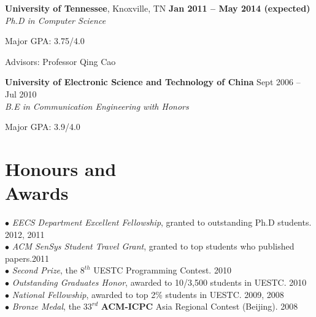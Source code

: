 \documentclass[margin,line]{resume}
\begin{document}
\begin{resume}
    \textbf{University of Tennessee}, Knoxville, TN \hfill \textbf{Jan 2011 -- May 2014 (expected)}\vspace{0mm}\\\vspace{0mm}%
    \textsl{Ph.D in Computer Science} \vspace{-1mm}\\\vspace{-2mm}%
    \begin{list2}
        \item Major GPA: 3.75/4.0
        \item Advisors:  Professor Qing Cao
    \end{list2}\vspace{-1mm}
    \textbf{University of Electronic Science and Technology of China} \hfill Sept 2006 -- Jul 2010\vspace{0mm}\\\vspace{0mm}%
	\textsl{B.E in Communication Engineering with Honors} \vspace{-1mm}\\\vspace{-2mm}%
	\begin{list2}
		\item Major GPA: 3.9/4.0
	\end{list2}\vspace{3mm} 


    \section{\mysidestyle Honours and\\Awards} 

    $\bullet$ \textsl{EECS Department Excellent Fellowship}, granted to outstanding Ph.D students. \hfill 2012, 2011\vspace{0mm}\\%
    $\bullet$ \textsl{ACM SenSys Student Travel Grant}, granted to top students who published papers.\hfill 2011\vspace{0mm}\\%
    $\bullet$ \textsl{Second Prize}, the $8^{th}$ UESTC Programming Contest. \hfill 2010\vspace{0mm}\\%
    $\bullet$ \textsl{Outstanding Graduates Honor}, awarded to 10/3,500 students in UESTC. \hfill 2010\vspace{0mm}\\%
    $\bullet$ \textsl{National Fellowship}, awarded to top 2\% students in UESTC. \hfill 2009, 2008\vspace{0mm}\\%
    $\bullet$ \textsl{Bronze Medal}, the $33^{rd}$ \textbf{ACM-ICPC} Asia Regional Contest (Beijing). \hfill 2008\\ 

\end{resume}
\end{document}
